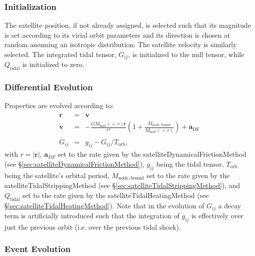 \subsubsection{Initialization}

The satellite position, if not already assigned, is selected such that its magnitude is set according to its virial orbit parameters and its direction is chosen at random assuming an isotropic distribution.  The satellite velocity is similarly selected.  The integrated tidal tensor, $G_{ij}$, is initialized to the null tensor, while $Q_\mathrm{tidal}$ is initialized to zero.

\subsubsection{Differential Evolution}

Properties are evolved according to:
\begin{eqnarray}
\dot{\mathbf{r}}&=&\mathbf{v}\\
\dot{\mathbf{v}}&=&-\frac{G M_\mathrm{host}(<r)\mathbf{r}}{r^3}\left(1+\frac{M_\mathrm{node,bound}}{M_\mathrm{host}(<r)}\right)+\mathbf{a}_\mathrm{DF}\\
\dot{G}_{ij}&=&g_{ij}-G_{ij}/T_\mathrm{orb},
\end{eqnarray}
with $r=|\mathbf{r}|$, $\mathbf{a}_{DF}$ set to the rate given by the {\normalfont \ttfamily satelliteDynamicalFrictionMethod} (see \S\ref{sec:satelliteDynamicalFrictionMethod}), $g_{ij}$ being the tidal tensor, $T_\mathrm{orb}$ being the satellite's orbital period, $\dot{M}_\mathrm{node,bound}$ set to the rate given by the {\normalfont \ttfamily satelliteTidalStrippingMethod} (see \S\ref{sec:satelliteTidalStrippingMethod}), and $\dot{Q}_\mathrm{tidal}$ set to the rate given by the {\normalfont \ttfamily satelliteTidalHeatingMethod} (see \S\ref{sec:satelliteTidalHeatingMethod}). Note that in the evolution of $G_{ij}$ a decay term is artificially introduced such that the integration of $g_{ij}$ is effectively over just the previous orbit (i.e. over the previous tidal shock).

\subsubsection{Event Evolution}

